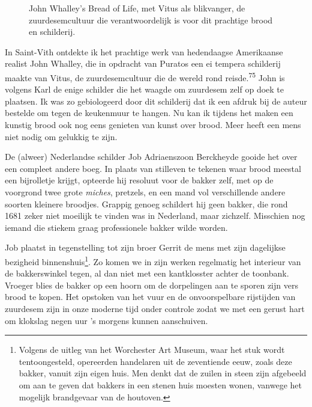 \documentclass[
  11pt,
  dutch,
]{memoir}
\newcommand{\adjustimg}{%
  \checkoddpage%
  \ifoddpage\hspace*{\dimexpr\evensidemargin-\oddsidemargin}\else\hspace*{-\dimexpr\evensidemargin-\oddsidemargin}\fi%
}
\newcommand{\centerimg}[2][width=\textwidth]{%
  \makebox[\textwidth]{\adjustimg\texttt{[image: \#2]}}%
}
\begin{document}
\par
\begin{figure}
    \noindent\centerimg[width=\paperwidth]{img/bw/breadoflife.jpg}
    \caption[Bread of Life \textcopyright \: John Whalley. Met dank aan Puratos.]{John Whalley's Bread of Life, met Vitus als blikvanger, de zuurdesemcultuur die verantwoordelijk is voor dit prachtige brood en schilderij.}
\end{figure}

In Saint-Vith ontdekte ik het prachtige werk van hedendaagse Amerikaanse
realist John Whalley, die in opdracht van Puratos een ei tempera
schilderij maakte van Vitus, de zuurdesemcultuur die de wereld rond
reisde.\textsuperscript{75} John is volgens Karl de enige schilder die
het waagde om zuurdesem zelf op doek te plaatsen. Ik was zo gebiologeerd
door dit schilderij dat ik een afdruk bij de auteur bestelde om tegen de
keukenmuur te hangen. Nu kan ik tijdens het maken een kunstig brood ook
nog eens genieten van kunst over brood. Meer heeft een mens niet nodig
om gelukkig te zijn.

De (alweer) Nederlandse schilder Job Adriaenszoon Berckheyde gooide het
over een compleet andere boeg. In plaats van stilleven te tekenen waar
brood meestal een bijrolletje krijgt, opteerde hij resoluut voor de
bakker zelf, met op de voorgrond twee grote \emph{miches}, pretzels, en
een mand vol verschillende andere soorten kleinere broodjes. Grappig
genoeg schildert hij geen bakker, die rond 1681 zeker niet moeilijk te
vinden was in Nederland, maar zichzelf. Misschien nog iemand die stiekem
graag professionele bakker wilde worden.

Job plaatst in tegenstelling tot zijn broer Gerrit de mens met zijn
dagelijkse bezigheid binnenshuis\footnote{Volgens de uitleg van het
  Worchester Art Museum, waar het stuk wordt tentoongesteld, opereerden
  handelaren uit de zeventiende eeuw, zoals deze bakker, vanuit zijn
  eigen huis. Men denkt dat de zuilen in steen zijn afgebeeld om aan te
  geven dat bakkers in een stenen huis moesten wonen, vanwege het
  mogelijk brandgevaar van de houtoven.}. Zo komen we in zijn werken
regelmatig het interieur van de bakkerswinkel tegen, al dan niet met een
kantklosster achter de toonbank. Vroeger blies de bakker op een hoorn om
de dorpelingen aan te sporen zijn vers brood te kopen. Het opstoken van
het vuur en de onvoorspelbare rijstijden van zuurdesem zijn in onze
moderne tijd onder controle zodat we met een gerust hart om klokslag
negen uur 's morgens kunnen aanschuiven.
\end{document}
